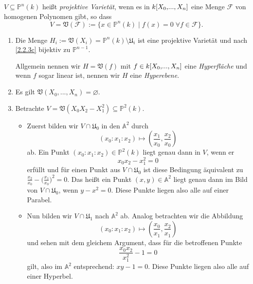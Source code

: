 \documentclass[a4paper,12pt,index=toc]{scrbook}
\theoremstyle{keinenummern} %
\def\A{\mathbb{A}}
\def\V{\mathfrak{V}}
\def\P{\mathbb{P}}
\newcommand{\F}{\mathcal{F}}
\def\U{\mathfrak{U}}
\newcommand{\leer}{\ensuremath{\varnothing}}
\renewcommand{\dotsc}{\ensuremath{\!...}}
\newcommand{\ppolyx}[1][n]{\ensuremath%
  [X_{0},\dotsc,X_{#1}]}
\begin{document}
\begin{dfn}\label{2.3.2}
$V\subseteq\P^{n}(k)$ heißt \emph{projektive Varietät}, wenn es in $k\ppolyx$ eine Menge $\F$ von homogenen Polynomen gibt, so dass
\[V=\V(\F):=\{x\in\P^{n}(k)\mid f(x)=0\;\forall f\in\F\}.\]
\end{dfn}

\begin{bsp}\label{2.3.3}\begin{enumerate}
\item Die Menge $H_{i}:=\V(X_{i})=\P^{n}(k)\setminus \U_{i}$ ist eine projektive Varietät und nach \cref{2.2.3c} bijektiv zu $\P^{n-1}$.

Allgemein nennen wir $H=\V(f)$ mit $f\in k\ppolyx$ eine \emph{Hyperfläche} und wenn $f$ sogar linear ist, nennen wir $H$ eine \emph{Hyperebene}.
\item Es gilt $\V(X_{0},\dotsc,X_{n})=\leer$.
\item Betrachte $V=\V(X_{0}X_{2}-X_{1}^{2})\subseteq\P^{2}(k)$.
\begin{itemize}
\item Zuerst bilden wir $V\cap \U_{0}$ in den $\A^{2}$ durch
\[(x_{0}:x_{1}:x_{2})\mapsto\left(\frac{x_{1}}{x_{0}},\frac{x_{2}}{x_{0}}\right)\]
ab. Ein Punkt $(x_{0}:x_{1}:x_{2})\in\P^{2}(k)$ liegt genau dann in $V$, wenn er \[x_{0}x_{2}-x_{1}^{2}=0\] erfüllt und für einen Punkt aus $V\cap \U_{0}$ ist diese Bedingung äquivalent zu $\frac{x_{2}}{x_{0}}-\bigl(\frac{x_{1}}{x_{0}}\bigr)^{2}=0$. Das heißt ein Punkt $(x,y)\in\A^{2}$ liegt genau dann im Bild von $V\cap \U_{0}$, wenn $y-x^{2}=0$. Diese Punkte liegen also alle auf einer Parabel.
\item Nun bilden wir $V\cap \U_{1}$ nach $\A^{2}$ ab. Analog betrachten wir die Abbildung
\[(x_{0}:x_{1}:x_{2})\mapsto\left(\frac{x_{0}}{x_{1}},\frac{x_{2}}{x_{1}}\right)\]
und sehen mit dem gleichem Argument, dass für die betroffenen Punkte \[\frac{x_{0}x_{2}}{x_{1}^{2}}-1=0\] gilt, also im $\A^{2}$ entsprechend: $xy-1=0$. Diese Punkte liegen also alle auf einer Hyperbel.
\end{itemize}\end{enumerate}\end{bsp}
\end{document}
